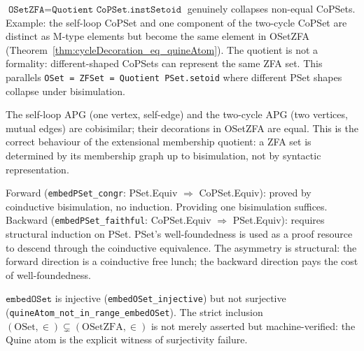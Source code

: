 \begin{remark}
\label{rem:M3_quotient}
\leanok
{}
$\texttt{OSetZFA} = \texttt{Quotient CoPSet.instSetoid}$ genuinely collapses
non-equal CoPSets.  Example: the self-loop CoPSet and one component of
the two-cycle CoPSet are distinct as M-type elements but become the same
element in OSetZFA (Theorem~\ref{thm:cycleDecoration_eq_quineAtom}).
The quotient is not a formality: different-shaped CoPSets can represent
the same ZFA set.  This parallels \texttt{OSet = ZFSet = Quotient PSet.setoid}
where different PSet shapes collapse under bisimulation.
\end{remark}

\begin{remark}
\label{rem:M4_bisim_collapse}
\leanok
{}
The self-loop APG (one vertex, self-edge) and the two-cycle APG (two
vertices, mutual edges) are cobisimilar; their decorations in OSetZFA
are equal.  This is the correct behaviour of the extensional membership
quotient: a ZFA set is determined by its membership graph up to
bisimulation, not by syntactic representation.
\end{remark}

\begin{remark}
\label{rem:M5_embed_asymm}
\leanok
{}
Forward (\texttt{embedPSet\_congr}: PSet.Equiv $\Rightarrow$ CoPSet.Equiv):
proved by coinductive bisimulation, no induction.  Providing one
bisimulation suffices.  Backward (\texttt{embedPSet\_faithful}:
CoPSet.Equiv $\Rightarrow$ PSet.Equiv): requires structural induction on
PSet.  PSet's well-foundedness is used as a proof resource to descend
through the coinductive equivalence.  The asymmetry is structural:
the forward direction is a coinductive free lunch; the backward direction
pays the cost of well-foundedness.
\end{remark}

\begin{remark}
\label{rem:M6_strict_inclusion}
\leanok
{}
$\texttt{embedOSet}$ is injective (\texttt{embedOSet\_injective}) but not
surjective (\texttt{quineAtom\_not\_in\_range\_embedOSet}).  The strict
inclusion $(\mathrm{OSet}, \in) \subsetneq (\mathrm{OSetZFA}, \in)$ is
not merely asserted but machine-verified: the Quine atom is the explicit
witness of surjectivity failure.
\end{remark}

